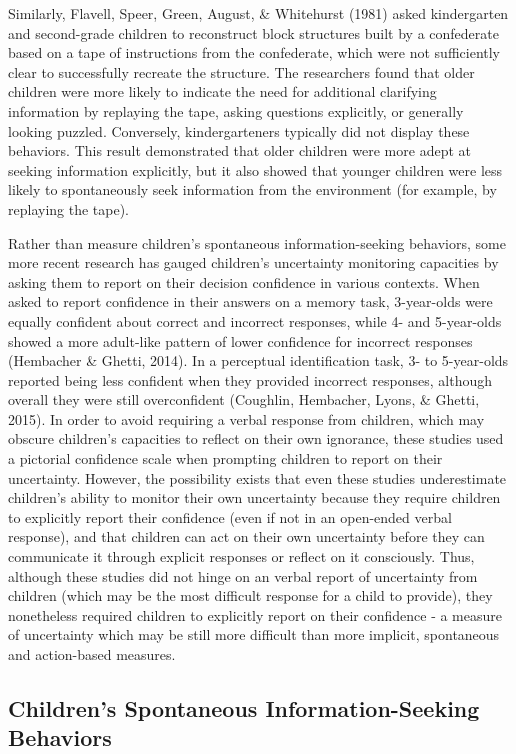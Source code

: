 \documentclass[,man,floatsintext]{apa6}
\begin{document}
Similarly, Flavell, Speer, Green, August, \& Whitehurst (1981) asked kindergarten and second-grade children to reconstruct block structures built by a confederate based on a tape of instructions from the confederate, which were not sufficiently clear to successfully recreate the structure. The researchers found that older children were more likely to indicate the need for additional clarifying information by replaying the tape, asking questions explicitly, or generally looking puzzled. Conversely, kindergarteners typically did not display these behaviors. This result demonstrated that older children were more adept at seeking information explicitly, but it also showed that younger children were less likely to spontaneously seek information from the environment (for example, by replaying the tape).

Rather than measure children's spontaneous information-seeking behaviors, some more recent research has gauged children's uncertainty monitoring capacities by asking them to report on their decision confidence in various contexts. When asked to report confidence in their answers on a memory task, 3-year-olds were equally confident about correct and incorrect responses, while 4- and 5-year-olds showed a more adult-like pattern of lower confidence for incorrect responses (Hembacher \& Ghetti, 2014). In a perceptual identification task, 3- to 5-year-olds reported being less confident when they provided incorrect responses, although overall they were still overconfident (Coughlin, Hembacher, Lyons, \& Ghetti, 2015). In order to avoid requiring a verbal response from children, which may obscure children's capacities to reflect on their own ignorance, these studies used a pictorial confidence scale when prompting children to report on their uncertainty. However, the possibility exists that even these studies underestimate children's ability to monitor their own uncertainty because they require children to explicitly report their confidence (even if not in an open-ended verbal response), and that children can act on their own uncertainty before they can communicate it through explicit responses or reflect on it consciously. Thus, although these studies did not hinge on an verbal report of uncertainty from children (which may be the most difficult response for a child to provide), they nonetheless required children to explicitly report on their confidence - a measure of uncertainty which may be still more difficult than more implicit, spontaneous and action-based measures.

\hypertarget{childrens-spontaneous-information-seeking-behaviors}{%
\subsection{Children's Spontaneous Information-Seeking Behaviors}\label{childrens-spontaneous-information-seeking-behaviors}}
\end{document}
